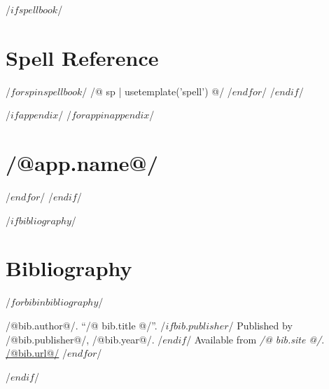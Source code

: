 \documentclass[10pt,twocolumn,twoside,openany]{book}
\begin{document}
/$ if spellbook $/
\chapter{Spell Reference}
\label{appendix_spell_reference}
/$ for sp in spellbook $/
/@ sp | usetemplate('spell') @/
\vspace*{16pt}
/$endfor $/
/$endif$/

/$ if appendix $/
/$ for app in appendix $/
\onecolumn
\titlespacing*{\chapter}{0pt}{-16pt}{0pt}
\chapter{/@app.name@/}
\label{appendix_/@app.label@/}
/$ endfor $/
\twocolumn
\titlespacing*{\chapter}{0pt}{0pt}{0pt}
/$ endif $/

/$ if bibliography $/
\chapter{Bibliography}
\label{appendix_bibliography}
\begin{flushleft}


/$ for bib in bibliography $/

\par /@bib.author@/. ``/@ bib.title @/''. /$ if bib.publisher $/ 
Published by /@bib.publisher@/, /@bib.year@/. /$ endif $/ %
Available from \textit{/@ bib.site @/}.\\ 
{\small \href{/@bib.link@/}{/@bib.url@/}}
\vspace*{3mm}
/$ endfor $/
\end{flushleft}
/$ endif $/

\newpage
\centerline{}
\end{document}
